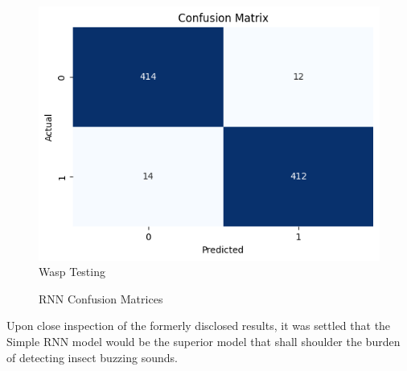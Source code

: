 \documentclass[12pt]{article}
\begin{document}
\begin{enumerate}
\begin{figure}[H]
\begin{minipage}[H]{0.45\textwidth}
				\includegraphics[width=\textwidth]{Images/Confusion/RNN test.png}\\ \vspace{0.5 cm}
				Wasp Testing
			\end{minipage}
			\vspace{1.5 cm}
			\caption{RNN Confusion Matrices}
		\end{figure}
	\end{enumerate} 
	Upon close inspection of the formerly disclosed results, it was settled that the Simple RNN model would be the superior model that shall shoulder the burden of detecting insect buzzing sounds.
	
\end{document}
